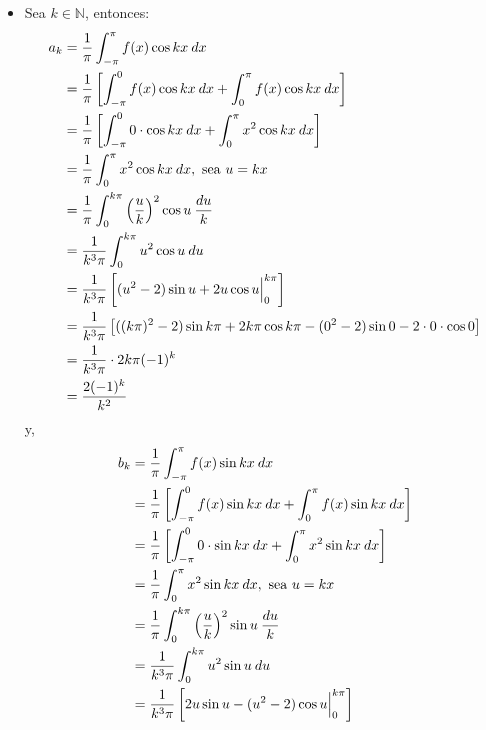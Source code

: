 \documentclass[12pt]{report}
\theoremstyle{largebreak}
\begin{document}
\begin{sol}
\begin{itemize}
            \item Sea $k\in\mathbb{N}$, entonces:
            \begin{equation*}
                \begin{split}
                    a_k&=\frac{1}{\pi}\int_{-\pi}^{\pi}f(x)\cos kx\:dx\\
                    &=\frac{1}{\pi}\left[\int_{-\pi}^{0}f(x)\cos kx\:dx+\int_{0}^{\pi}f(x)\cos kx\:dx\right] \\
                    &=\frac{1}{\pi}\left[\int_{-\pi}^{0}0\cdot\cos kx\:dx+\int_{0}^{\pi}x^2\cos kx\:dx\right]\\
                    &=\frac{1}{\pi}\int_{0}^{\pi}x^2\cos kx\:dx,\textup{ sea }u=kx \\
                    &=\frac{1}{\pi}\int_{0}^{k\pi}\left(\frac{u}{k}\right)^2\cos u\:\frac{du}{k}\\
                    &=\frac{1}{k^3\pi}\int_{0}^{k\pi}u^2\cos u\:du\\
                    &=\frac{1}{k^3\pi}\left[(u^2-2)\sin u+2u\cos u\Big|_{0}^{k\pi} \right]\\
                    &=\frac{1}{k^3\pi}\left[((k\pi)^2-2)\sin k\pi+2k\pi\cos k\pi-(0^2-2)\sin 0-2\cdot0\cdot\cos0\right]\\
                    &=\frac{1}{k^3\pi}\cdot2k\pi(-1)^{k}\\
                    &=\frac{2(-1)^{k}}{k^2}\\
                \end{split}
            \end{equation*}
            y,
            \begin{equation*}
                \begin{split}
                    b_k&=\frac{1}{\pi}\int_{-\pi}^{\pi}f(x)\sin kx\:dx\\
                    &=\frac{1}{\pi}\left[\int_{-\pi}^{0}f(x)\sin kx\:dx+\int_{0}^{\pi}f(x)\sin kx\:dx\right] \\
                    &=\frac{1}{\pi}\left[\int_{-\pi}^{0}0\cdot\sin kx\:dx+\int_{0}^{\pi}x^2\sin kx\:dx\right]\\
                    &=\frac{1}{\pi}\int_{0}^{\pi}x^2\sin kx\:dx,\textup{ sea }u=kx \\
                    &=\frac{1}{\pi}\int_{0}^{k\pi}\left(\frac{u}{k}\right)^2\sin u\:\frac{du}{k}\\
                    &=\frac{1}{k^3\pi}\int_{0}^{k\pi}u^2\sin u\:du\\
                    &=\frac{1}{k^3\pi}\left[2u\sin u-(u^2-2)\cos u\Big|_{0}^{k\pi}\right]\\

\end{split}
\end{equation*}
\end{itemize}
\end{sol}
\end{document}
